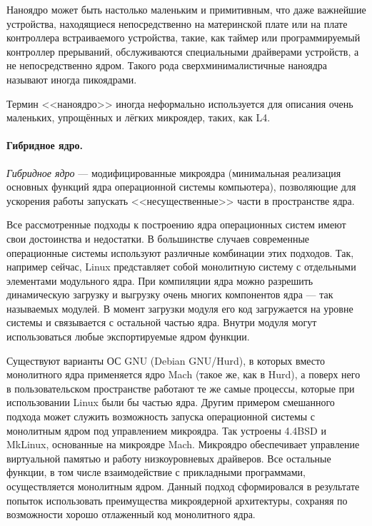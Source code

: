 Наноядро может быть настолько маленьким и примитивным, что даже важнейшие устройства, находящиеся непосредственно на материнской плате или на плате контроллера встраиваемого устройства, такие, как таймер или программируемый контроллер прерываний, обслуживаются специальными драйверами устройств, а не непосредственно ядром. Такого рода сверхминималистичные наноядра называют иногда пикоядрами.

Термин <<наноядро>> иногда неформально используется для описания очень маленьких, упрощённых и лёгких микроядер, таких, как L4.

\paragraph{Гибридное ядро.}\label{base:os:structure:kernel:types:hybrid} \emph{Гибридное ядро} --- модифицированные микроядра (минимальная реализация основных функций ядра операционной системы компьютера), позволяющие для ускорения работы запускать <<несущественные>> части в пространстве ядра.

Все рассмотренные подходы к построению ядра операционных систем имеют свои достоинства и недостатки. В большинстве случаев современные операционные системы используют различные комбинации этих подходов. 
Так, например сейчас, Linux представляет собой монолитную систему с отдельными элементами модульного ядра. При компиляции ядра можно разрешить динамическую загрузку и выгрузку очень многих компонентов ядра --- так называемых модулей.
В момент загрузки модуля его код загружается на уровне системы и связывается с остальной частью ядра. Внутри модуля могут использоваться любые экспортируемые ядром функции.

Существуют варианты ОС GNU (Debian GNU/Hurd), в которых вместо монолитного ядра применяется ядро Mach (такое же, как в Hurd), а поверх него в пользовательском пространстве работают те же самые процессы, которые при использовании Linux были бы частью ядра.
Другим примером смешанного подхода может служить возможность запуска операционной системы с монолитным ядром под управлением микроядра. Так устроены 4.4BSD и MkLinux, основанные на микроядре Mach.
Микроядро обеспечивает управление виртуальной памятью и работу низкоуровневых драйверов. Все остальные функции, в том числе взаимодействие с прикладными программами, осуществляется монолитным ядром. Данный подход сформировался в результате попыток использовать преимущества микроядерной архитектуры, сохраняя по возможности хорошо отлаженный код монолитного ядра.

